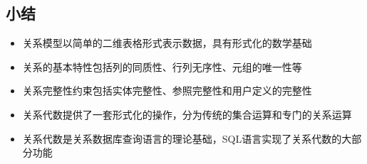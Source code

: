 \documentclass{../../note}
\begin{document}
\subsection{小结}

\begin{itemize}
  \item 关系模型以简单的二维表格形式表示数据，具有形式化的数学基础
  \item 关系的基本特性包括列的同质性、行列无序性、元组的唯一性等
  \item 关系完整性约束包括实体完整性、参照完整性和用户定义的完整性
  \item 关系代数提供了一套形式化的操作，分为传统的集合运算和专门的关系运算
  \item 关系代数是关系数据库查询语言的理论基础，SQL语言实现了关系代数的大部分功能
\end{itemize}
\end{document}
